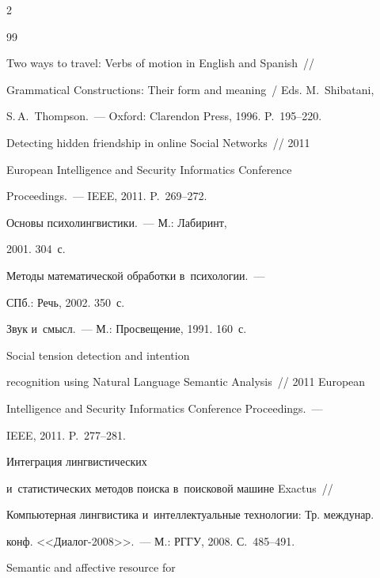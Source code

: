 \begin{multicols}{2}
{{\begin{thebibliography}{99}

 Two ways to travel: Verbs of motion in English and Spanish~// 

Grammatical Constructions: Their form and meaning~/ Eds. M.~Shibatani, 

S.\,A.~Thompson.~--- Oxford: Clarendon Press, 1996. P.~195--220.


 Detecting hidden friendship in online Social Networks~// 2011 

European Intelligence and Security Informatics Conference  

Proceedings.~--- IEEE, 2011. P.~269--272.


 Основы психолингвистики.~--- М.: Лабиринт, 

2001. 304~с.


 Методы математической обработки в~психологии.~--- 

СПб.: Речь, 2002. 350~с.


 Звук и~смысл.~--- М.: Просвещение, 1991. 160~с.


 Social tension detection and intention 

recognition using Natural Language Semantic Analysis~// 2011 European 

Intelligence and Security Informatics Conference Proceedings.~--- 

IEEE, 2011. P.~277--281.


 Интеграция лингвистических 

и~статистических методов поиска в~поисковой машине Exactus~// 

Компьютерная лингвистика и~интеллектуальные технологии: Тр. междунар. 

конф. <<Диалог-2008>>.~--- М.: РГГУ, 2008. С.~485--491.


 Semantic and affective resource for 


\end{thebibliography}}}
\end{multicols}

